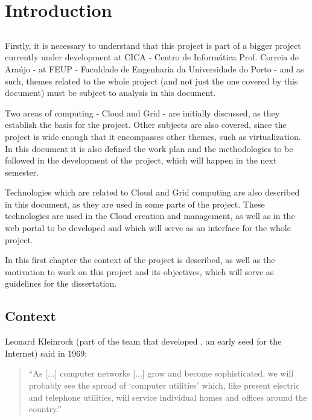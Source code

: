 \chapter{Introduction} \label{chap:intro}

\section*{}

Firstly, it is necessary to understand that this project is part of a bigger project currently under development at CICA - Centro de Informática Prof. Correia de Araújo - at FEUP - Faculdade de Engenharia da Universidade do Porto - and as such, themes related to the whole project (and not just the one covered by this document) must be subject to analysis in this document. 

Two areas of computing - Cloud and Grid - are initially discussed, as they establish the basis for the project. Other subjects are also covered, since the project is wide enough that it encompasses other themes, such as virtualization. In this document it is also defined the work plan and the methodologies to be followed in the development of the project, which will happen in the next semester.

Technologies which are related to Cloud and Grid computing are also described in this document, as they are used in some parts of the project. These technologies are used in the Cloud creation and management, as well as in the web portal to be developed and which will serve as an interface for the whole project.

In this first chapter the context of the project is described, as well as the motivation to work on this project and its objectives, which will serve as guidelines for the dissertation.
	
	
\section{Context} \label{sec:context}

	Leonard Kleinrock (part of the team that developed \Arpanet, an early seed for the Internet) said in 1969:

\begin{quote}
  ``As [...] computer networks [...] grow and become sophisticated, we will probably see the spread of `computer utilities' which, like present electric and telephone utilities, will service individual homes and offices around the country.''~\cite{Buyya2009599} 
\end{quote}
	
